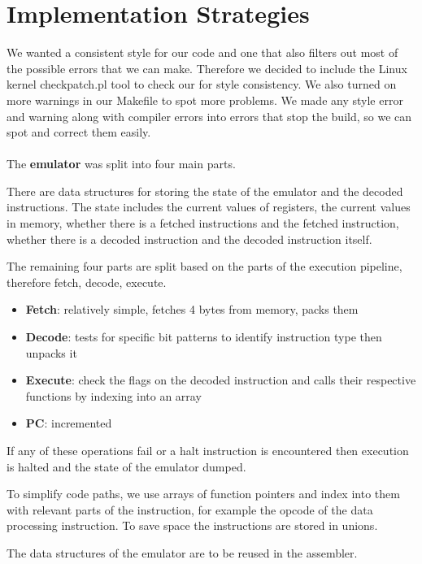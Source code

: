 \documentclass[11pt]{article}
\begin{document}
\section{Implementation Strategies}

We wanted a consistent style for our code and one that also filters out most of
the possible errors that we can make. Therefore we decided to include the Linux
kernel checkpatch.pl tool to check our for style consistency. We also turned on
more warnings in our Makefile to spot more problems. We made any style error and
warning along with compiler errors into errors that stop the build, so we can
spot and correct them easily. \\ \\

The \textbf{emulator} was split into four main parts.

There are data structures for storing the state of the emulator and the
decoded instructions. The state includes the current values of registers, the
current values in memory, whether there is a fetched instructions and the
fetched instruction, whether there is a decoded instruction and the decoded
instruction itself.

The remaining four parts are split based on the parts of the execution pipeline,
therefore fetch, decode, execute.

\begin{itemize}[noitemsep,topsep=0pt]
    \item \textbf{Fetch}: relatively simple, fetches 4 bytes from memory,
      packs them
    \item \textbf{Decode}: tests for specific bit patterns to identify
      instruction type then unpacks it
    \item \textbf{Execute}: check the flags on the decoded instruction and calls
      their respective functions by indexing into an array
    \item \textbf{PC}: incremented
\end{itemize}

If any of these operations fail or a halt instruction is encountered then
execution is halted and the state of the emulator dumped.

To simplify code paths, we use arrays of function pointers and index into them
with relevant parts of the instruction, for example the opcode of the data
processing instruction. To save space the instructions are stored in unions.

The data structures of the emulator are to be reused in the assembler. \\
\end{document}
